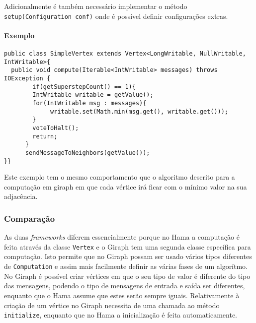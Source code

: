 Adicionalmente é também necessário implementar o método \texttt{setup(Configuration conf)} onde é possível definir configurações extras.

\paragraph{Exemplo}
\begin{verbatim}
public class SimpleVertex extends Vertex<LongWritable, NullWritable, 
IntWritable>{
  public void compute(Iterable<IntWritable> messages) throws IOException {
	    if(getSuperstepCount() == 1){
        IntWritable writable = getValue();
        for(IntWritable msg : messages){
	         writable.set(Math.min(msg.get(), writable.get()));
        }
        voteToHalt();
        return;
      }
      sendMessageToNeighbors(getValue());
}}
\end{verbatim}

Este exemplo tem o mesmo comportamento que o algoritmo descrito para a 
computação em giraph em que cada vértice irá ficar com o mínimo valor na sua 
adjacência.

\subsubsection*{Comparação}


As duas \textit{frameworks} diferem essencialmente porque no Hama a computação é feita através da classe \texttt{Vertex} e o Giraph tem uma segunda classe específica para computação. Isto permite que no Giraph possam ser usado vários tipos diferentes de \texttt{Computation} e assim mais facilmente definir as várias fases de um algorítmo.
No Giraph é possível criar vértices em que o seu tipo de valor é diferente do tipo das mensagens, podendo o tipo de mensagens de entrada e saída ser diferentes, enquanto que o Hama assume que estes serão sempre iguais. Relativamente à criação de um vértice no Giraph necessita de uma chamada ao método \texttt{initialize}, enquanto que no Hama a inicialização é feita automaticamente.